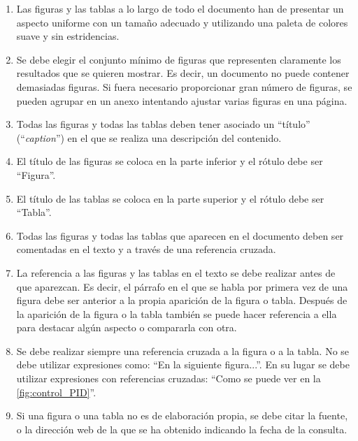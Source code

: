 \documentclass[11pt]{article}
\begin{document}
\begin{enumerate}

    \item Las figuras y las tablas a lo largo de todo el documento han de presentar un aspecto uniforme con un tamaño adecuado y utilizando una paleta de colores suave y sin estridencias.

    \item Se debe elegir el conjunto mínimo de figuras que representen claramente los resultados que se quieren mostrar. Es decir, un documento no puede contener demasiadas figuras. Si fuera necesario proporcionar gran número de figuras, se pueden agrupar en un anexo intentando ajustar varias figuras en una página.

    \item Todas las figuras y todas las tablas deben tener asociado un ``título'' (``\textit{caption}'') en el que se realiza una descripción del contenido.

    \item El título de las figuras se coloca en la parte inferior y el rótulo debe ser ``Figura''.

    \item El título de las tablas se coloca en la parte superior y el rótulo debe ser ``Tabla''.
    
    \item Todas las figuras y todas las tablas que aparecen en el documento deben ser comentadas en el texto y a través de una referencia cruzada.
    
    \item La referencia a las figuras y las tablas en el texto se debe realizar antes de que aparezcan. Es decir, el párrafo en el que se habla por primera vez de una figura debe ser anterior a la propia aparición de la figura o tabla. Después de la aparición de la figura o la tabla también se puede hacer referencia a ella para destacar algún aspecto o compararla con otra.
    
    \item Se debe realizar siempre una referencia cruzada a la figura o a la tabla. No se debe utilizar expresiones como: ``En la siguiente figura...''. En su lugar se debe utilizar expresiones con referencias cruzadas: ``Como se puede ver en la \autoref{fig:control_PID}''.

    \item Si una figura o una tabla no es de elaboración propia, se debe citar la fuente, o la dirección web de la que se ha obtenido indicando la fecha de la consulta.
    
\end{enumerate}
\end{document}
